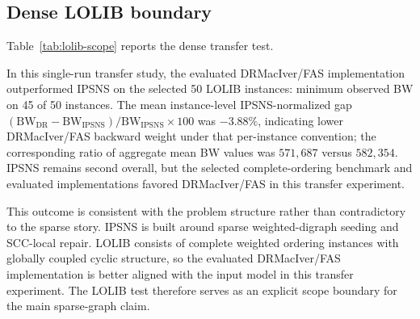 \subsection{Dense LOLIB boundary}
\label{subsec:lolib-boundary}

Table~\ref{tab:lolib-scope} reports the dense transfer test.



In this single-run transfer study, the evaluated DRMacIver/FAS implementation outperformed IPSNS on the selected 50 LOLIB instances: minimum observed BW on 45 of 50 instances. The mean instance-level IPSNS-normalized gap \((\mathrm{BW}_{\mathrm{DR}}-\mathrm{BW}_{\mathrm{IPSNS}})/\mathrm{BW}_{\mathrm{IPSNS}}\times 100\) was \(-3.88\%\), indicating lower DRMacIver/FAS backward weight under that per-instance convention; the corresponding ratio of aggregate mean BW values was \(571{,}687\) versus \(582{,}354\). IPSNS remains second overall, but the selected complete-ordering benchmark and evaluated implementations favored DRMacIver/FAS in this transfer experiment.

This outcome is consistent with the problem structure rather than contradictory to the sparse story. IPSNS is built around sparse weighted-digraph seeding and SCC-local repair. LOLIB consists of complete weighted ordering instances with globally coupled cyclic structure, so the evaluated DRMacIver/FAS implementation is better aligned with the input model in this transfer experiment. The LOLIB test therefore serves as an explicit scope boundary for the main sparse-graph claim.
